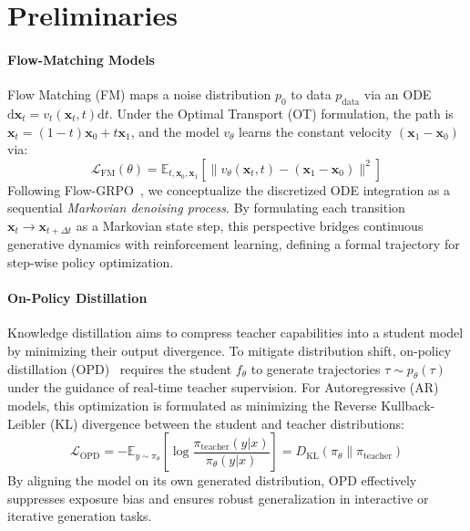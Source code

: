 \section{Preliminaries}
\paragraph{Flow-Matching Models}
Flow Matching (FM) maps a noise distribution $p_0$ to data $p_{\text{data}}$ via an ODE $\text{d}\mathbf{x}_t = v_t(\mathbf{x}_t, t) \text{d}t$. Under the Optimal Transport (OT) formulation, the path is $\mathbf{x}_t = (1-t)\mathbf{x}_0 + t\mathbf{x}_1$, and the model $v_\theta$ learns the constant velocity $(\mathbf{x}_1 - \mathbf{x}_0)$ via:
\begin{equation}
    \mathcal{L}_{\text{FM}}(\theta) = \mathbb{E}_{t, \mathbf{x}_0, \mathbf{x}_1} \left[ \| v_\theta(\mathbf{x}_t, t) - (\mathbf{x}_1 - \mathbf{x}_0) \|^2 \right]
\end{equation}
Following Flow-GRPO~\cite{liu2025flow}, we conceptualize the discretized ODE integration as a sequential \textit{Markovian denoising process}. By formulating each transition $\mathbf{x}_{t} \to \mathbf{x}_{t+\Delta t}$ as a Markovian state step, this perspective bridges continuous generative dynamics with reinforcement learning, defining a formal trajectory for step-wise policy optimization.

\paragraph{On-Policy Distillation}
Knowledge distillation aims to compress teacher capabilities into a student model by minimizing their output divergence. To mitigate distribution shift, on-policy distillation (OPD)~\cite{lu2025onpolicydistillation} requires the student $f_\theta$ to generate trajectories $\tau \sim p_\theta(\tau)$ under the guidance of real-time teacher supervision. For Autoregressive (AR) models, this optimization is formulated as minimizing the Reverse Kullback-Leibler (KL) divergence between the student and teacher distributions:
\begin{equation}
\label{opd}
    \mathcal{L}_{\text{OPD}} = -\mathbb{E}_{y \sim \pi_\theta} \left[ \log \frac{\pi_{\text{teacher}}(y|x)}{\pi_{\theta}(y|x)} \right] = D_{\text{KL}}(\pi_{\theta} \| \pi_{\text{teacher}})
\end{equation}
By aligning the model on its own generated distribution, OPD effectively suppresses exposure bias and ensures robust generalization in interactive or iterative generation tasks.